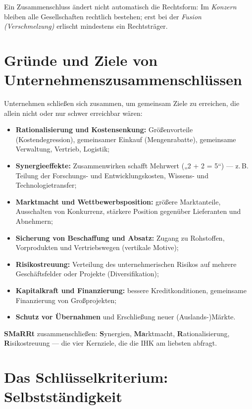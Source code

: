 \documentclass[11pt, a4paper]{article}
\begin{document}
\begin{merksatz}
Ein Zusammenschluss ändert nicht automatisch die Rechtsform: Im \emph{Konzern} bleiben
alle Gesellschaften rechtlich bestehen; erst bei der \emph{Fusion (Verschmelzung)}
erlischt mindestens ein Rechtsträger.
\end{merksatz}

\section{Gründe und Ziele von Unternehmenszusammenschlüssen}

Unternehmen schließen sich zusammen, um gemeinsam Ziele zu erreichen, die allein nicht
oder nur schwer erreichbar wären:

\begin{itemize}
  \item \textbf{Rationalisierung und Kostensenkung:} Größenvorteile (Kostendegression),
    gemeinsamer Einkauf (Mengenrabatte), gemeinsame Verwaltung, Vertrieb, Logistik;
  \item \textbf{Synergieeffekte:} Zusammenwirken schafft Mehrwert („2 + 2 = 5``) ---
    z.\,B. Teilung der Forschungs- und Entwicklungskosten, Wissens- und
    Technologietransfer;
  \item \textbf{Marktmacht und Wettbewerbsposition:} größere Marktanteile, Ausschalten
    von Konkurrenz, stärkere Position gegenüber Lieferanten und Abnehmern;
  \item \textbf{Sicherung von Beschaffung und Absatz:} Zugang zu Rohstoffen,
    Vorprodukten und Vertriebswegen (vertikale Motive);
  \item \textbf{Risikostreuung:} Verteilung des unternehmerischen Risikos auf mehrere
    Geschäftsfelder oder Projekte (Diversifikation);
  \item \textbf{Kapitalkraft und Finanzierung:} bessere Kreditkonditionen, gemeinsame
    Finanzierung von Großprojekten;
  \item \textbf{Schutz vor Übernahmen} und Erschließung neuer (Auslands-)Märkte.
\end{itemize}

\begin{eselsbruecke}
\textbf{SMaRRt} zusammenschließen: \textbf{S}ynergien, \textbf{Ma}rktmacht,
\textbf{R}ationalisierung, \textbf{R}isikostreuung --- die vier Kernziele, die die IHK
am liebsten abfragt.
\end{eselsbruecke}

\section{Das Schlüsselkriterium: Selbstständigkeit}
\end{document}
